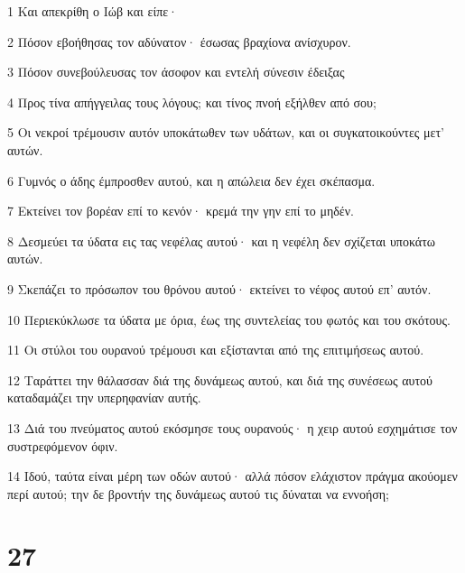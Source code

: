 \par 1 Και απεκρίθη ο Ιώβ και είπε·
\par 2 Πόσον εβοήθησας τον αδύνατον· έσωσας βραχίονα ανίσχυρον.
\par 3 Πόσον συνεβούλευσας τον άσοφον και εντελή σύνεσιν έδειξας
\par 4 Προς τίνα απήγγειλας τους λόγους; και τίνος πνοή εξήλθεν από σου;
\par 5 Οι νεκροί τρέμουσιν αυτόν υποκάτωθεν των υδάτων, και οι συγκατοικούντες μετ' αυτών.
\par 6 Γυμνός ο άδης έμπροσθεν αυτού, και η απώλεια δεν έχει σκέπασμα.
\par 7 Εκτείνει τον βορέαν επί το κενόν· κρεμά την γην επί το μηδέν.
\par 8 Δεσμεύει τα ύδατα εις τας νεφέλας αυτού· και η νεφέλη δεν σχίζεται υποκάτω αυτών.
\par 9 Σκεπάζει το πρόσωπον του θρόνου αυτού· εκτείνει το νέφος αυτού επ' αυτόν.
\par 10 Περιεκύκλωσε τα ύδατα με όρια, έως της συντελείας του φωτός και του σκότους.
\par 11 Οι στύλοι του ουρανού τρέμουσι και εξίστανται από της επιτιμήσεως αυτού.
\par 12 Ταράττει την θάλασσαν διά της δυνάμεως αυτού, και διά της συνέσεως αυτού καταδαμάζει την υπερηφανίαν αυτής.
\par 13 Διά του πνεύματος αυτού εκόσμησε τους ουρανούς· η χειρ αυτού εσχημάτισε τον συστρεφόμενον όφιν.
\par 14 Ιδού, ταύτα είναι μέρη των οδών αυτού· αλλά πόσον ελάχιστον πράγμα ακούομεν περί αυτού; την δε βροντήν της δυνάμεως αυτού τις δύναται να εννοήση;

\chapter{27}

